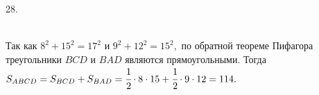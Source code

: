 28. \begin{figure}[ht!]
\end{figure}\\
Так как $8^2+15^2=17^2$ и $9^2+12^2=15^2,$ по обратной теореме Пифагора треугольники $BCD$ и $BAD$ являются прямоугольными. Тогда $S_{ABCD}=S_{BCD}+S_{BAD}=\cfrac{1}{2}\cdot8\cdot15+\cfrac{1}{2}\cdot9\cdot12=114.$\\

